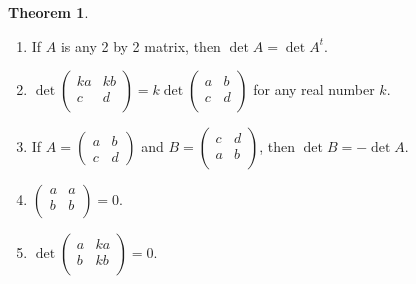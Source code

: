 \documentclass[11pt,a4paper]{article}
\theoremstyle{definition}
\newtheorem{thm}{Theorem}[subsection]
\begin{document}
\begin{thm}\label{thm:det2-props}
\begin{enumerate}
\item If $A$ is any 2 by 2 matrix, then $\det A=\det A^t$.
\item $\det
\begin{pmatrix}
ka&kb\\c&d\\
\end{pmatrix}
=k\det
\begin{pmatrix}
a&b\\c&d\\
\end{pmatrix}
$ for any real number $k$.
\item If $A=
\begin{pmatrix}
a&b\\c&d
\end{pmatrix}
$ and $B=
\begin{pmatrix}
c&d\\a&b\\
\end{pmatrix}
$, then $\det B=-\det A$.
\item $
\begin{pmatrix}
a&a\\b&b\\
\end{pmatrix}
=0$.
\item $
\det
\begin{pmatrix}
a&ka\\b&kb\\
\end{pmatrix}
=0$.
\end{enumerate}
\end{thm}
\end{document}
